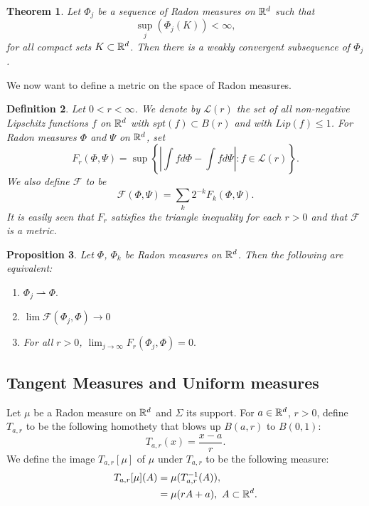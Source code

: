 \documentclass[11pt]{article}
\newtheorem{theorem}{Theorem}[section]
\newtheorem{definition}[theorem]{Definition}
\newtheorem{proposition}[theorem]{Proposition}
\theoremstyle{definition}
\theoremstyle{remark}
\numberwithin{equation}{section}
\begin{document}
\begin{theorem}\label{weakconv}
Let $\Phi_j$ be a sequence of Radon measures on $\mathbb{R}^{d}$ such that
$$ \sup_{j}(\Phi_j(K)) < \infty ,$$
for all compact sets $K \subset \mathbb{R}^{d}$. Then there is a weakly convergent subsequence of $\Phi_j$.
\end{theorem}

We now want to define a metric on the space of Radon measures.

\begin{definition}\label{L(r)}
Let $0<r<\infty$. We denote by $\mathcal{L}(r)$ the set of all non-negative Lipschitz functions $f$ on $\mathbb{R}^{d}$ with $spt(f) \subset B(r)$ and with $Lip(f) \leq 1$. For Radon measures $\Phi$ and $\Psi$ on $\mathbb{R}^d$, set
$$F_{r}(\Phi, \Psi)= \sup\left\lbrace \left| \int f d\Phi - \int f d\Psi \right| : f \in \mathcal{L}(r) \right\rbrace.$$
We also define $\mathcal{F}$ to be 
$$\mathcal{F}(\Phi, \Psi) = \sum_{k} 2^{-k} F_{k}(\Phi,\Psi). $$ 
It is easily seen that $F_r$ satisfies the triangle inequality for each $r>0$ and that $\mathcal{F}$ is a metric.
\end{definition}

\begin{proposition}
Let $\Phi$, $\Phi_{k}$ be Radon measures on $\mathbb{R}^{d}$. Then the following are equivalent:
\begin{enumerate}
\item $\Phi_j \rightharpoonup \Phi.$
\item $\lim \mathcal{F}(\Phi_j, \Phi) \to 0$
\item For all $r>0$, $\lim_{j \to \infty} F_{r}(\Phi_{j}, \Phi)=0.$


\end{enumerate}

\end{proposition}

\subsection{Tangent Measures and Uniform measures}
Let $\mu$ be a Radon measure on $\mathbb{R}^{d}$ and $\Sigma$ its support.
For $a \in \mathbb{R}^{d}$, $r>0$, define $T_{a,r}$ to be the following homothety that blows up $B(a,r)$  to $B(0,1)$:
\begin{equation} 
T_{a,r}(x)=\frac{x-a}{r} . \nonumber
\end{equation}
We define the image $T_{a,r}[\mu] $ of $\mu$ under $T_{a,r}$ to be the following measure:
\begin{align*}
T_{a,r}[\mu](A) & =\mu(T_{a,r}^{-1}(A)),\\ &=\mu(rA+a), \text{  } A \subset {\mathbb{R}}^{d}. 
\end{align*}
\end{document}
